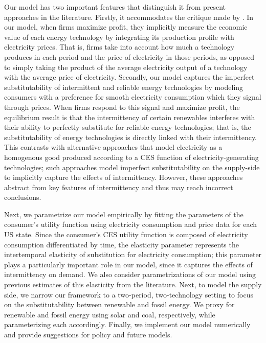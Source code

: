 \documentclass[11pt,a4paper,leqno]{extarticle}
\begin{document}
	Our model has two important features that distinguish it from present approaches in the literature. Firstly, it accommodates the critique made by \citet{Joskow2011}. In our model, when firms maximize profit, they implicitly measure the economic value of each energy technology by integrating its production profile with electricity prices. That is, firms take into account how much a technology produces in each period and the price of electricity in those periods, as opposed to simply taking the product of the average electricity output of a technology with the average price of electricity. Secondly, our model captures the imperfect substitutability of intermittent and reliable energy technologies  by modeling consumers with a preference for smooth electricity consumption which they signal through prices. When firms respond to this signal and maximize profit, the equilibrium result  is that the intermittency of certain renewables interferes with their ability to perfectly substitute for reliable energy technologies; that is, the substitutability of energy technologies is directly linked with their intermittency.
	This contrasts with alternative approaches that model electricity as a homogenous good produced according to  a CES function of electricity-generating technologies; such approaches model imperfect substitutability on the supply-side to implicitly capture the effects of intermittency. However, these approaches abstract from key features of intermittency and thus may reach incorrect conclusions. 
	
	Next, we parametrize our model empirically by fitting the parameters of the consumer's utility function using electricity consumption and price data for each US state. Since the consumer's CES utility function is composed of electricity consumption differentiated by time, the elasticity parameter represents the intertemporal elasticity of substitution for electricity consumption; this parameter plays a particularly important role in our model, since it captures the effects of intermittency on demand. We also consider parametrizations of our model using previous estimates of this elasticity from the literature. Next, to model the supply side, we narrow our framework to a two-period, two-technology setting to focus on the substitutability between renewable and fossil energy. We proxy for renewable and fossil energy using solar and coal, respectively, while parameterizing each accordingly. Finally, we implement our model numerically and provide suggestions for policy and future models. 
	
\end{document}
